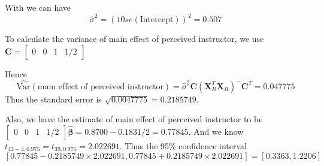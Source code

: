 \documentclass{article}
\begin{document}
\begin{enumerate}[leftmargin = 0 em, label = \arabic*., font = \bfseries]
\begin{enumerate}
		With we can have 
		\[\hat{\sigma}^2 = (10 se(\mathrm{Intercept}))^2 = 0.507\]

		To calculate the variance of main effect of perceived instructor, we use $\bm C = \begin{bmatrix}
			0 & 0 & 1 & 1/2
		\end{bmatrix}$

		Hence 
		\[\hat{\mathrm{Var}}(\textrm{main effect of perceived instructor}) = \hat{\sigma}^2 \bm C (\bm X_{R}^T \bm X_{R})^{-} \bm C^T = 0.047775\]
		Thus the standard error is $\sqrt{0.0047775} = 0.2185749$.

		Also, we have the estimate of main effect of perceived instructor to be $\begin{bmatrix}
			0 & 0 & 1 & 1/2
		\end{bmatrix} \hat{\bm \beta} = 0.8700 - 0.1831/2 = 0.77845.$ And we know $t_{43 - 4 ,0.975} = t_{39, 0.975} = 2.022691 $. Thus the 95\% confidence interval
		\[[0.77845 - 0.2185749 \times 2.022691, 0.77845 + 0.2185749\times 2.022691] = [0.3363, 1.2206]\]

	\end{enumerate}
	
	
	
	


 	\end{enumerate}


	
	
	
	
\end{document}
